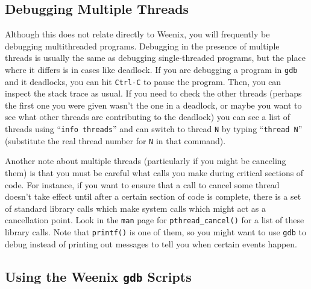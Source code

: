 \subsection{Debugging Multiple Threads}

Although this does not relate directly to Weenix, you will frequently be debugging multithreaded programs. Debugging in the presence of multiple threads is usually the same as debugging single-threaded programs, but the place where it differs is in cases like deadlock. If you are debugging a program in \texttt{gdb} and it deadlocks, you can hit \texttt{Ctrl-C} to pause the program. Then, you can inspect the stack trace as usual. If you need to check the other threads (perhaps the first one you were given wasn't the one in a deadlock, or maybe you want to see what other threads are contributing to the deadlock) you can see a list of threads using ``\texttt{info threads}'' and can switch to thread \texttt{N} by typing ``\texttt{thread N}'' (substitute the real thread number for \texttt{N} in that command).

Another note about multiple threads (particularly if you might be canceling them) is that you must be careful what calls you make during critical sections of code. For instance, if you want to ensure that a call to cancel some thread doesn't take effect until after a certain section of code is complete, there is a set of standard library calls which make system calls which might act as a cancellation point. Look in the \texttt{man} page for \texttt{pthread\_cancel()} for a list of these library calls. Note that \texttt{printf()} is one of them, so you might want to use \texttt{gdb} to debug instead of printing out messages to tell you when certain events happen.

\subsection{Using the Weenix \texttt{gdb} Scripts}

